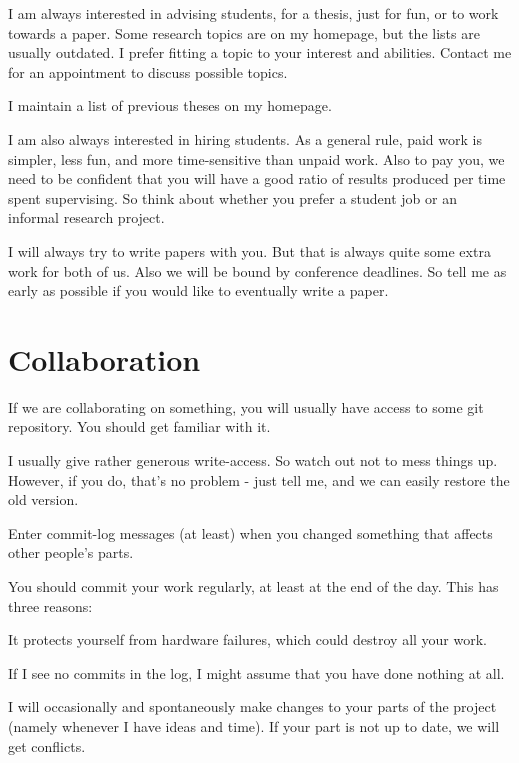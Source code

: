 \documentclass[12pt]{article}
\begin{document}
I am always interested in advising students, for a thesis, just for fun, or to work towards a paper.
Some research topics are on my homepage, but the lists are usually outdated.
I prefer fitting a topic to your interest and abilities.
Contact me for an appointment to discuss possible topics.
\medskip

I maintain a list of previous theses on my homepage.
\medskip

I am also always interested in hiring students.
As a general rule, paid work is simpler, less fun, and more time-sensitive than unpaid work.
Also to pay you, we need to be confident that you will have a good ratio of results produced per time spent supervising.
So think about whether you prefer a student job or an informal research project.
\medskip

I will always try to write papers with you.
But that is always quite some extra work for both of us.
Also we will be bound by conference deadlines.
So tell me as early as possible if you would like to eventually write a paper.

\section{Collaboration}

If we are collaborating on something, you will usually have access to some git repository. You should get familiar with it.
\medskip

I usually give rather generous write-access. So watch out not to mess things up. However, if you do, that's no problem - just tell me, and we can easily restore the old version.
\medskip

Enter commit-log messages (at least) when you changed something that affects other people's parts.
\medskip

You should commit your work regularly, at least at the end of the day. This has three reasons:
\begin{compactitem}
\item It protects yourself from hardware failures, which could destroy all your work.
\item If I see no commits in the log, I might assume that you have done nothing at all.
\item I will occasionally and spontaneously make changes to your parts of the project (namely whenever I have ideas and time). If your part is not up to date, we will get conflicts.
\end{compactitem}
\end{document}
